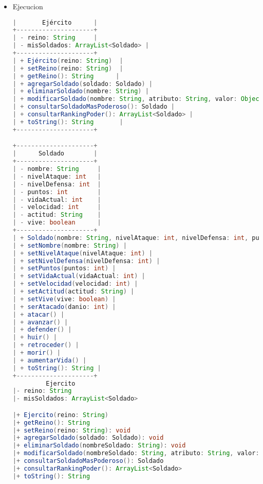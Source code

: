 \documentclass{article}
\begin{document}
\begin{itemize}
\begin{itemize}
        \\
        \\
        \item Ejecucion
        \begin{lstlisting}[language=java]
|       Ejército      |
+---------------------+
| - reino: String     |
| - misSoldados: ArrayList<Soldado> |
+---------------------+
| + Ejército(reino: String)  |
| + setReino(reino: String)  |
| + getReino(): String      |
| + agregarSoldado(soldado: Soldado) |
| + eliminarSoldado(nombre: String) |
| + modificarSoldado(nombre: String, atributo: String, valor: Object) |
| + consultarSoldadoMasPoderoso(): Soldado |
| + consultarRankingPoder(): ArrayList<Soldado> |
| + toString(): String       |
+---------------------+

+---------------------+
|      Soldado        |
+---------------------+
| - nombre: String     |
| - nivelAtaque: int   |
| - nivelDefensa: int  |
| - puntos: int        |
| - vidaActual: int    |
| - velocidad: int     |
| - actitud: String    |
| - vive: boolean      |
+---------------------+
| + Soldado(nombre: String, nivelAtaque: int, nivelDefensa: int, puntos: int, vidaActual: int, velocidad: int, actitud: String) |
| + setNombre(nombre: String) |
| + setNivelAtaque(nivelAtaque: int) |
| + setNivelDefensa(nivelDefensa: int) |
| + setPuntos(puntos: int) |
| + setVidaActual(vidaActual: int) |
| + setVelocidad(velocidad: int) |
| + setActitud(actitud: String) |
| + setVive(vive: boolean) |
| + serAtacado(danio: int) |
| + atacar() |
| + avanzar() |
| + defender() |
| + huir() |
| + retroceder() |
| + morir() |
| + aumentarVida() |
| + toString(): String |
+---------------------+
         Ejercito
|- reino: String
|- misSoldados: ArrayList<Soldado>

|+ Ejercito(reino: String)
|+ getReino(): String
|+ setReino(reino: String): void
|+ agregarSoldado(soldado: Soldado): void
|+ eliminarSoldado(nombreSoldado: String): void
|+ modificarSoldado(nombreSoldado: String, atributo: String, valor: Object): void
|+ consultarSoldadoMasPoderoso(): Soldado
|+ consultarRankingPoder(): ArrayList<Soldado>
|+ toString(): String

        \end{lstlisting}
	\end{itemize}


\end{itemize}
\end{document}
